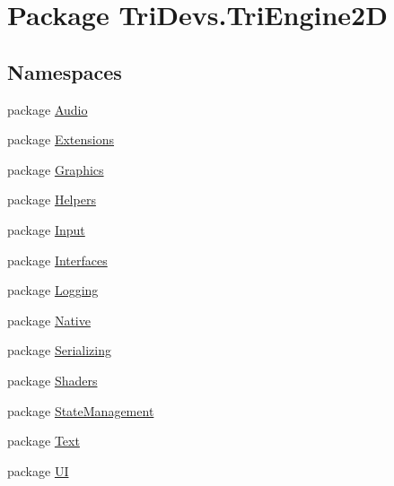\hypertarget{namespace_tri_devs_1_1_tri_engine2_d}{\section{Package Tri\-Devs.\-Tri\-Engine2\-D}
\label{namespace_tri_devs_1_1_tri_engine2_d}
}
\subsection*{Namespaces}
\begin{DoxyCompactItemize}
\item 
package \hyperlink{namespace_tri_devs_1_1_tri_engine2_d_1_1_audio}{Audio}
\item 
package \hyperlink{namespace_tri_devs_1_1_tri_engine2_d_1_1_extensions}{Extensions}
\item 
package \hyperlink{namespace_tri_devs_1_1_tri_engine2_d_1_1_graphics}{Graphics}
\item 
package \hyperlink{namespace_tri_devs_1_1_tri_engine2_d_1_1_helpers}{Helpers}
\item 
package \hyperlink{namespace_tri_devs_1_1_tri_engine2_d_1_1_input}{Input}
\item 
package \hyperlink{namespace_tri_devs_1_1_tri_engine2_d_1_1_interfaces}{Interfaces}
\item 
package \hyperlink{namespace_tri_devs_1_1_tri_engine2_d_1_1_logging}{Logging}
\item 
package \hyperlink{namespace_tri_devs_1_1_tri_engine2_d_1_1_native}{Native}
\item 
package \hyperlink{namespace_tri_devs_1_1_tri_engine2_d_1_1_serializing}{Serializing}
\item 
package \hyperlink{namespace_tri_devs_1_1_tri_engine2_d_1_1_shaders}{Shaders}
\item 
package \hyperlink{namespace_tri_devs_1_1_tri_engine2_d_1_1_state_management}{State\-Management}
\item 
package \hyperlink{namespace_tri_devs_1_1_tri_engine2_d_1_1_text}{Text}
\item 
package \hyperlink{namespace_tri_devs_1_1_tri_engine2_d_1_1_u_i}{U\-I}
\end{DoxyCompactItemize}
